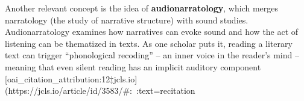 \documentclass[12pt]{report}
\begin{document}
Another relevant concept is the idea of \textbf{audionarratology}, which merges narratology (the study of narrative structure) with sound studies. Audionarratology examines how narratives can evoke sound and how the act of listening can be thematized in texts. As one scholar puts it, reading a literary text can trigger “phonological recoding” – an inner voice in the reader’s mind – meaning that even silent reading has an implicit auditory component [oai_citation_attribution:12‡jcls.io](https://jcls.io/article/id/3583/#:~:text=recitation%
\end{document}
